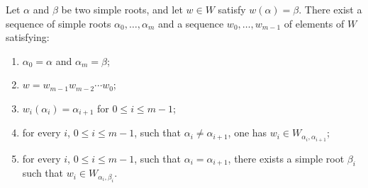 \begin{theorem}[Tits]\label{sga3:XXI:5.6}
Let \(\alpha\) and \(\beta\) be two simple roots, and let \(w\in W\)
satisfy \(w(\alpha)=\beta\). There exist a sequence of simple roots
\(\alpha_0,\ldots,\alpha_m\) and a sequence
\(w_0,\ldots,w_{m-1}\) of elements of \(W\) satisfying:
\begin{enumerate}
\item[(i)] \(\alpha_0=\alpha\) and \(\alpha_m=\beta\);
\item[(ii)] \(w=w_{m-1}w_{m-2}\cdots w_0\);
\item[(iii)] \(w_i(\alpha_i)=\alpha_{i+1}\) for
  \(0\le i\le m-1\);
\item[(iv)] for every \(i\), \(0\le i\le m-1\), such that
  \(\alpha_i\ne\alpha_{i+1}\), one has
  \(w_i\in W_{\alpha_i,\alpha_{i+1}}\);
\item[(v)] for every \(i\), \(0\le i\le m-1\), such that
  \(\alpha_i=\alpha_{i+1}\), there exists a simple root \(\beta_i\)
  such that \(w_i\in W_{\alpha_i,\beta_i}\).
\end{enumerate}
\end{theorem}
